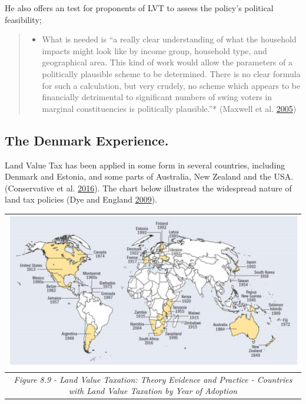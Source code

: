 \documentclass[]{tufte-handout}
\providecommand{\tightlist}{%
  \setlength{\itemsep}{0pt}\setlength{\parskip}{0pt}}
\begin{document}
He also offers an test for proponents of LVT to assess the policy's
political feasibility;

\begin{quote}
\begin{itemize}
\tightlist
\item
  What is needed is ``a really clear understanding of what the household
  impacts might look like by income group, household type, and
  geographical area. This kind of work would allow the parameters of a
  politically plausible scheme to be determined. There is no clear
  formula for such a calculation, but very crudely, no scheme which
  appears to be financially detrimental to significant numbers of swing
  voters in marginal constituencies is politically plausible.''*
  (Maxwell et al. \protect\hyperlink{ref-Maxwell}{2005})
\end{itemize}
\end{quote}

\hypertarget{the-denmark-experience.}{%
\subsection{The Denmark Experience.}\label{the-denmark-experience.}}

Land Value Tax has been applied in some form in several countries,
including Denmark and Estonia, and some parts of Australia, New Zealand
and the USA. (Conservative et al.
\protect\hyperlink{ref-Conservative2016}{2016}). The chart below
illustrates the widespread nature of land tax policies (Dye and England
\protect\hyperlink{ref-Dye2009}{2009}).

\begin{longtable}[]{@{}c@{}}
\toprule
\begin{minipage}[b]{0.97\columnwidth}\centering
\includegraphics{ChapterPictures/8-9-DenmarkLVT.png}\strut
\end{minipage}\tabularnewline
\midrule
\endhead
\begin{minipage}[t]{0.97\columnwidth}\centering
\emph{Figure 8.9 - Land Value Taxation: Theory Evidence and Practice -
Countries with Land Value Taxation by Year of Adoption}\strut
\end{minipage}\tabularnewline
\bottomrule
\end{longtable}
\end{document}

